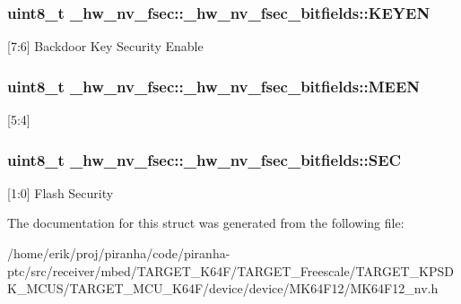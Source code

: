 \subsubsection[{\texorpdfstring{K\+E\+Y\+EN}{KEYEN}}]{\setlength{\rightskip}{0pt plus 5cm}uint8\+\_\+t \+\_\+hw\+\_\+nv\+\_\+fsec\+::\+\_\+hw\+\_\+nv\+\_\+fsec\+\_\+bitfields\+::\+K\+E\+Y\+EN}\hypertarget{struct__hw__nv__fsec_1_1__hw__nv__fsec__bitfields_a6a7cc4a40532f6aaad6a080fa8e7aa6d}{}\label{struct__hw__nv__fsec_1_1__hw__nv__fsec__bitfields_a6a7cc4a40532f6aaad6a080fa8e7aa6d}
\mbox{[}7\+:6\mbox{]} Backdoor Key Security Enable 
\subsubsection[{\texorpdfstring{M\+E\+EN}{MEEN}}]{\setlength{\rightskip}{0pt plus 5cm}uint8\+\_\+t \+\_\+hw\+\_\+nv\+\_\+fsec\+::\+\_\+hw\+\_\+nv\+\_\+fsec\+\_\+bitfields\+::\+M\+E\+EN}\hypertarget{struct__hw__nv__fsec_1_1__hw__nv__fsec__bitfields_abd59843058bc5e5527960a17b2ab1c21}{}\label{struct__hw__nv__fsec_1_1__hw__nv__fsec__bitfields_abd59843058bc5e5527960a17b2ab1c21}
\mbox{[}5\+:4\mbox{]} 
\subsubsection[{\texorpdfstring{S\+EC}{SEC}}]{\setlength{\rightskip}{0pt plus 5cm}uint8\+\_\+t \+\_\+hw\+\_\+nv\+\_\+fsec\+::\+\_\+hw\+\_\+nv\+\_\+fsec\+\_\+bitfields\+::\+S\+EC}\hypertarget{struct__hw__nv__fsec_1_1__hw__nv__fsec__bitfields_a12b270003398b0a38f7c6656b62b633f}{}\label{struct__hw__nv__fsec_1_1__hw__nv__fsec__bitfields_a12b270003398b0a38f7c6656b62b633f}
\mbox{[}1\+:0\mbox{]} Flash Security 

The documentation for this struct was generated from the following file\+:\begin{DoxyCompactItemize}
\item 
/home/erik/proj/piranha/code/piranha-\/ptc/src/receiver/mbed/\+T\+A\+R\+G\+E\+T\+\_\+\+K64\+F/\+T\+A\+R\+G\+E\+T\+\_\+\+Freescale/\+T\+A\+R\+G\+E\+T\+\_\+\+K\+P\+S\+D\+K\+\_\+\+M\+C\+U\+S/\+T\+A\+R\+G\+E\+T\+\_\+\+M\+C\+U\+\_\+\+K64\+F/device/device/\+M\+K64\+F12/M\+K64\+F12\+\_\+nv.\+h\end{DoxyCompactItemize}
